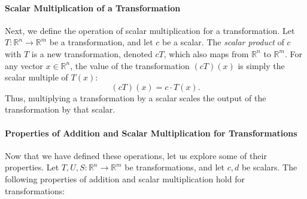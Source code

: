 \documentclass[a4paper,12pt]{article}
\begin{document}
\paragraph{Scalar Multiplication of a Transformation}
Next, we define the operation of scalar multiplication for a transformation. Let \( T: \mathbb{R}^n \to \mathbb{R}^m \) be a transformation, and let \( c \) be a scalar. The \textit{scalar product} of \( c \) with \( T \) is a new transformation, denoted \( cT \), which also maps from \( \mathbb{R}^n \) to \( \mathbb{R}^m \). For any vector \( x \in \mathbb{R}^n \), the value of the transformation \( (cT)(x) \) is simply the scalar multiple of \( T(x) \):
\[
(cT)(x) = c \cdot T(x).
\]
Thus, multiplying a transformation by a scalar scales the output of the transformation by that scalar.

\paragraph{Properties of Addition and Scalar Multiplication for Transformations}

Now that we have defined these operations, let us explore some of their properties. Let \( T, U, S: \mathbb{R}^n \to \mathbb{R}^m \) be transformations, and let \( c, d \) be scalars. The following properties of addition and scalar multiplication hold for transformations:
\end{document}
